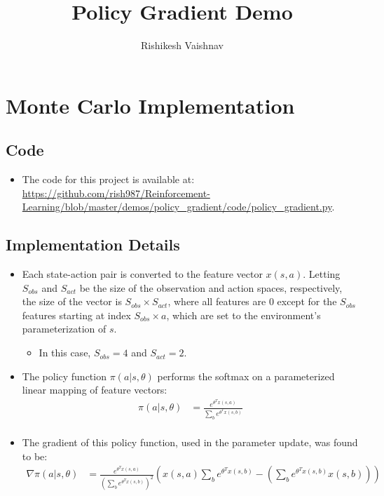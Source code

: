 \documentclass[a4paper]{article}
\title{Policy Gradient Demo}
\author{Rishikesh Vaishnav}
\begin{document}
\maketitle
\section*{Monte Carlo Implementation}
\subsection*{Code}
\begin{itemize}
    \item The code for this project is available at: 
\url{https://github.com/rish987/Reinforcement-Learning/blob/master/demos/policy_gradient/code/policy_gradient.py}.
\end{itemize}
\subsection*{Implementation Details}
\begin{itemize}
    \item Each state-action pair is converted to the feature vector $x(s, a)$.
        Letting $S_{obs}$ and $S_{act}$ be the size of the observation and
        action spaces, respectively, the size of the vector is $S_{obs} \times
        S_{act}$, where all features are $0$ except for the $S_{obs}$ features
        starting at index $S_{obs} \times a$, which are set to the
        environment's parameterization of $s$.
    \begin{itemize}
        \item In this case, $S_{obs} = 4$ and $S_{act} = 2$.
    \end{itemize}
    \item The policy function $\pi(a | s, \theta)$ performs the softmax on a
        parameterized linear mapping of feature vectors:
        \begin{align*}
            \pi(a | s, \theta) &= \frac{e^{\theta^T x(s, a)}}
            {\sum_{b} e^{\theta^T x(s, b)}}\\
        \end{align*}
    \item The gradient of this policy function, used in the parameter update,
        was found to be:
        \begin{align*}
            \nabla \pi(a | s, \theta) &= 
            \frac{e^{\theta^T x(s, a)}}{(\sum_{b} e^{\theta^T x(s, b)}) ^2}
            \left(x(s, a) \sum_{b}
            e^{\theta^T x(s, b)} - \left(\sum_{b} e^{\theta^T x(s, b)} 
            x(s, b)\right)
            \right)
        \end{align*}
\end{itemize}
\end{document}
